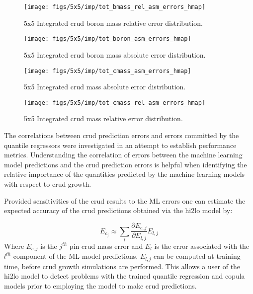 \begin{figure}[H]
    \centering
    \texttt{[image: figs/5x5/imp/tot\_bmass\_rel\_asm\_errors\_hmap]}
    \caption{5x5 Integrated crud boron mass relative error distribution.}
    \label{fig:totbmassrelasmerrorshmap}
\end{figure}
\begin{figure}[H]
    \centering
    \texttt{[image: figs/5x5/imp/tot\_boron\_asm\_errors\_hmap]}
    \caption{5x5 Integrated crud boron mass absolute error distribution.}
    \label{fig:totboronasmerrorshmap}
\end{figure}
\begin{figure}[H]
    \centering
    \texttt{[image: figs/5x5/imp/tot\_cmass\_asm\_errors\_hmap]}
    \caption{5x5 Integrated crud mass absolute error distribution.}
    \label{fig:totcmassasmerrorshmap}
\end{figure}
\begin{figure}[H]
    \centering
    \texttt{[image: figs/5x5/imp/tot\_cmass\_rel\_asm\_errors\_hmap]}
    \caption{5x5 Integrated crud mass relative error distribution.}
    \label{fig:totcmassrelasmerrorshmap}
\end{figure}

The correlations between crud prediction errors and errors committed by the quantile regressors were investigated in an attempt to establish performance metrics.  Understanding the correlation of errors between the machine learning model predictions and the crud prediction errors is helpful when identifying the relative importance of the quantities predicted by the machine learning models with respect to crud growth.

Provided sensitivities of the crud results to the ML errors one can estimate the expected accuracy of the crud predictions obtained via the hi2lo model by:

\begin{equation} \nonumber
    E_{c_j} \approx \sum_l \frac{\partial E_{c,j}}{\partial E_{l,j}}E_{l,j}
\end{equation}
Where $E_{c,j}$ is the $j^{th}$ pin crud mass error and $E_l$ is the error associated with the $l^{th}$ component of the ML model predictions.  $E_{l,j}$ can be computed at training time, before crud growth simulations are performed.
This allows a user of the hi2lo model to detect problems with the trained quantile regression and copula models prior to employing the model to make crud predictions.

